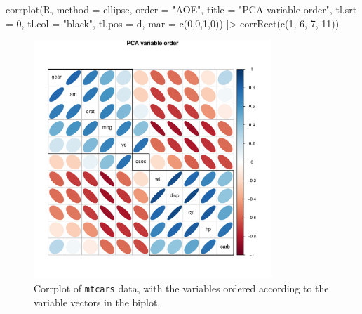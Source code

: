 \documentclass[
  letterpaper,
  10pt,
  krantz2]{krantz}
\makeatletter
\newenvironment{Shaded}{\begin{snugshade}}{\end{snugshade}}
\newcommand{\AttributeTok}[1]{\textcolor[rgb]{0.40,0.45,0.13}{#1}}
\newcommand{\DecValTok}[1]{\textcolor[rgb]{0.68,0.00,0.00}{#1}}
\newcommand{\FunctionTok}[1]{\textcolor[rgb]{0.28,0.35,0.67}{#1}}
\newcommand{\NormalTok}[1]{\textcolor[rgb]{0.00,0.23,0.31}{#1}}
\newcommand{\SpecialCharTok}[1]{\textcolor[rgb]{0.37,0.37,0.37}{#1}}
\newcommand{\StringTok}[1]{\textcolor[rgb]{0.13,0.47,0.30}{#1}}
\newenvironment{kframe}{%
  \medskip{}
  \setlength{\fboxsep}{.8em}
  \def\at@end@of@kframe{}%
  \ifinner\ifhmode%
  \def\at@end@of@kframe{\end{minipage}}%
  \begin{minipage}{\columnwidth}%
  \fi\fi%
  \def\FrameCommand##1{\hskip\@totalleftmargin \hskip-\fboxsep
  \colorbox{shadecolor}{##1}\hskip-\fboxsep
      \hskip-\linewidth \hskip-\@totalleftmargin \hskip\columnwidth}%
  \MakeFramed {\advance\hsize-\width
    \@totalleftmargin\z@ \linewidth\hsize
    \@setminipage}}%
{\par\unskip\endMakeFramed%
  \at@end@of@kframe}
\renewenvironment{Shaded}{\begin{kframe}}{\end{kframe}}
\makeatother
\begin{document}
\begin{Shaded}
\begin{Highlighting}[]
\FunctionTok{corrplot}\NormalTok{(R, }
         \AttributeTok{method =} \StringTok{\textquotesingle{}ellipse\textquotesingle{}}\NormalTok{, }
         \AttributeTok{order =} \StringTok{"AOE"}\NormalTok{,}
         \AttributeTok{title =} \StringTok{"PCA variable order"}\NormalTok{,}
         \AttributeTok{tl.srt =} \DecValTok{0}\NormalTok{, }\AttributeTok{tl.col =} \StringTok{"black"}\NormalTok{, }\AttributeTok{tl.pos =} \StringTok{\textquotesingle{}d\textquotesingle{}}\NormalTok{,}
         \AttributeTok{mar =} \FunctionTok{c}\NormalTok{(}\DecValTok{0}\NormalTok{,}\DecValTok{0}\NormalTok{,}\DecValTok{1}\NormalTok{,}\DecValTok{0}\NormalTok{)) }\SpecialCharTok{|\textgreater{}}
  \FunctionTok{corrRect}\NormalTok{(}\FunctionTok{c}\NormalTok{(}\DecValTok{1}\NormalTok{, }\DecValTok{6}\NormalTok{, }\DecValTok{7}\NormalTok{, }\DecValTok{11}\NormalTok{))}
\end{Highlighting}
\end{Shaded}

\begin{figure}[H]

{\centering \includegraphics[width=0.8\textwidth,height=\textheight]{figs/ch04/fig-mtcars-corrplot-pcaorder-1.pdf}

}

\caption{\label{fig-mtcars-corrplot-pcaorder}Corrplot of \texttt{mtcars}
data, with the variables ordered according to the variable vectors in
the biplot.}

\end{figure}
\end{document}
